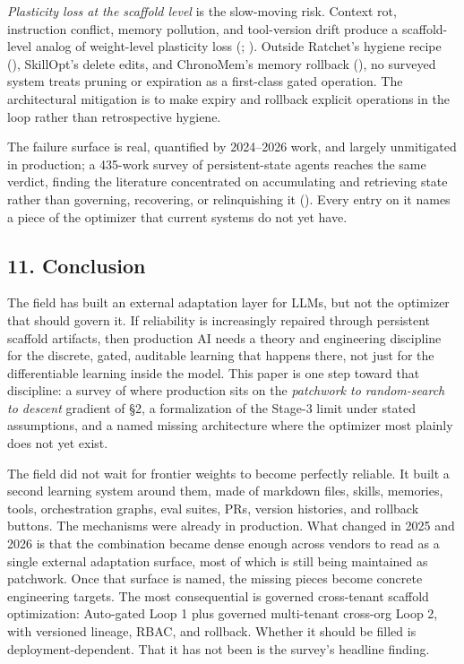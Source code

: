 \documentclass[
]{article}
\begin{document}
\emph{Plasticity loss at the scaffold level} is the slow-moving risk.
Context rot, instruction conflict, memory pollution, and tool-version
drift produce a scaffold-level analog of weight-level plasticity loss
(;
). Outside
Ratchet's hygiene recipe (), SkillOpt's delete edits, and ChronoMem's memory rollback
(), no surveyed system
treats pruning or expiration as a first-class gated operation. The
architectural mitigation is to make expiry and rollback explicit
operations in the loop rather than retrospective hygiene.

The failure surface is real, quantified by 2024--2026 work, and largely
unmitigated in production; a 435-work survey of persistent-state agents
reaches the same verdict, finding the literature concentrated on
accumulating and retrieving state rather than governing, recovering, or
relinquishing it ().
Every entry on it names a piece of the optimizer that current systems do
not yet have.

\subsection{11. Conclusion}\label{conclusion}

The field has built an external adaptation layer for LLMs, but not the
optimizer that should govern it. If reliability is increasingly repaired
through persistent scaffold artifacts, then production AI needs a theory
and engineering discipline for the discrete, gated, auditable learning
that happens there, not just for the differentiable learning inside the
model. This paper is one step toward that discipline: a survey of where
production sits on the \emph{patchwork to random-search to descent}
gradient of §2, a formalization of the Stage-3 limit under stated
assumptions, and a named missing architecture where the optimizer most
plainly does not yet exist.

The field did not wait for frontier weights to become perfectly
reliable. It built a second learning system around them, made of
markdown files, skills, memories, tools, orchestration graphs, eval
suites, PRs, version histories, and rollback buttons. The mechanisms
were already in production. What changed in 2025 and 2026 is that the
combination became dense enough across vendors to read as a single
external adaptation surface, most of which is still being maintained as
patchwork. Once that surface is named, the missing pieces become
concrete engineering targets. The most consequential is governed
cross-tenant scaffold optimization: Auto-gated Loop 1 plus governed
multi-tenant cross-org Loop 2, with versioned lineage, RBAC, and
rollback. Whether it should be filled is deployment-dependent. That it
has not been is the survey's headline finding.
\end{document}
